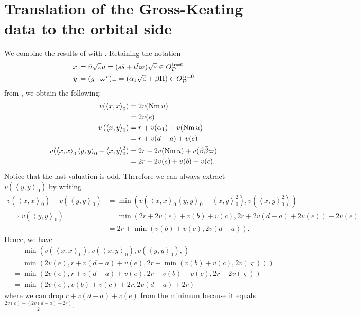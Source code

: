 \section{Translation of the Gross-Keating data to the orbital side}
We combine the results of  with .
Retaining the notation
\begin{align*}
  x &\coloneqq \bar u \sqrt{\varepsilon} u = (s \bar s + t \bar t \varpi) \sqrt{\varepsilon} \in O_\mathcal D^{\operatorname{tr} = 0} \\
  y &\coloneqq (g \cdot \varpi^r)_- = (\alpha_1\sqrt{\varepsilon} + \beta \Pi) \in O_\mathcal D^{\operatorname{tr} = 0}
\end{align*}
from , we obtain the following:
\begin{align*}
  v(\left\langle x,x \right\rangle _0)
    &= 2 v(\operatorname{Nm} u) \\
    &= 2v(e) \\
  v\left( \left\langle x,y \right\rangle _0 \right)
    &= r + v(\alpha_1) + v(\operatorname{Nm} u) \\
    &= r + v(d-a) + v(e) \\
  v(
    \left\langle x,x \right\rangle _0 \left\langle y,y \right\rangle _0
    - \left\langle x,y \right\rangle^2_0
  )
    &= 2r + 2 v(\operatorname{Nm} u) + v(\beta \bar\beta \varpi) \\
    &= 2r + 2v(e) + v(b) + v(c).
\end{align*}
Notice that the last valuation is odd.
Therefore we can always extract $v(\left\langle y,y \right\rangle _0)$ by writing
\begin{align*}
  v\left(\left\langle x,x \right\rangle _0\right) + v\left(\left\langle y,y \right\rangle _0\right)
  &= \min \left( v\left( \left\langle x,x \right\rangle _0 \left\langle y,y \right\rangle _0 - \left\langle x,y \right\rangle^2_0 \right),
    v(\left\langle x,y \right\rangle^2_0) \right) \\
  \implies  v\left(\left\langle y,y \right\rangle _0\right)
  &= \min(2r + 2v(e) + v(b) + v(c), 2r + 2v(d-a) + 2v(e)) - 2v(e) \\
  &= 2r + \min(v(b) + v(c), 2v(d-a)).
\end{align*}
Hence, we have
\begin{align*}
  &\phantom= \min\left(
    v(\left\langle x,x \right\rangle _0),
    v(\left\langle x,y \right\rangle _0),
    v(\left\langle y,y \right\rangle _0),
  \right) \\
  &= \min\left( 2v(e), r+v(d-a)+v(e), 2r+\min(v(b)+v(c), 2v(\varsigma)) \right) \\
  &= \min\left( 2v(e), r+v(d-a)+v(e), 2r+v(b)+v(c), 2r+2v(\varsigma) \right) \\
  &= \min\left( 2v(e), v(b)+v(c)+2r, 2v(d-a)+2r \right)
\end{align*}
where we can drop $r+v(d-a)+v(e)$ from the minimum because it equals
$\frac{2v(e) + (2v(d-a)+2r)}{2}$.

